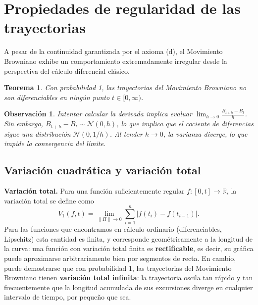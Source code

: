 \documentclass[12pt]{book}
\newtheorem{theorem}{Teorema}[chapter]
\newtheorem{remark}{Observación}[chapter]
\begin{document}
\section{Propiedades de regularidad de las trayectorias}

A pesar de la continuidad garantizada por el axioma (d), el Movimiento Browniano exhibe un comportamiento extremadamente irregular desde la perspectiva del cálculo diferencial clásico.

\begin{theorem}
Con probabilidad 1, las trayectorias del Movimiento Browniano no son diferenciables en ningún punto $t \in [0, \infty)$.
\end{theorem}

\begin{remark}
Intentar calcular la derivada implica evaluar $\lim_{h \to 0} \frac{B_{t+h}-B_t}{h}$. Sin embargo, $B_{t+h}-B_t \sim \mathcal{N}(0,h)$, lo que implica que el cociente de diferencias sigue una distribución $\mathcal{N}(0, 1/h)$. Al tender $h \to 0$, la varianza diverge, lo que impide la convergencia del límite.
\end{remark}

\subsection{Variación cuadrática y variación total}

\textbf{Variación total.} Para una función suficientemente regular $f:[0,t]\to\mathbb{R}$, la variación total se define como
\[
    V_1(f, t) = \lim_{\|\Pi\|\to 0} \sum_{i=1}^n |f(t_i) - f(t_{i-1})|.
\]
Para las funciones que encontramos en cálculo ordinario (diferenciables, Lipschitz) esta cantidad es finita, y corresponde geométricamente a la longitud de la curva: una función con variación total finita es \textbf{rectificable}, es decir, su gráfica puede aproximarse arbitrariamente bien por segmentos de recta. En cambio, puede demostrarse que con probabilidad 1, las trayectorias del Movimiento Browniano tienen \textbf{variación total infinita}: la trayectoria oscila tan rápido y tan frecuentemente que la longitud acumulada de sus excursiones diverge en cualquier intervalo de tiempo, por pequeño que sea.
\end{document}
